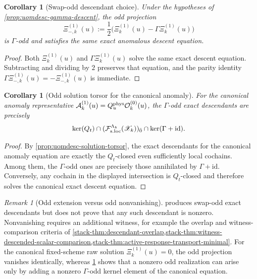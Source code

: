\documentclass[11pt]{article}
\theoremstyle{definition}
\theoremstyle{plain}
\newtheorem{corollary}[definition]{Corollary}
\theoremstyle{remark}
\newtheorem{remark}[definition]{Remark}
\newcommand{\Fsloc}{\mathcal F_{\rm s.loc}}
\newcommand{\Xscr}{\mathscr X}
\newcommand{\Ozero}{\mathcal O^{(0)}}
\newcommand{\Aone}{\mathcal A^{(1)}}
\newcommand{\Xione}{\Xi^{(1)}}
\newcommand{\Qt}{Q_t}
\newcommand{\Quphys}{Q_u^{\rm phys}}
\newcommand{\id}{\mathrm{id}}
\begin{document}
\begin{corollary}[Swap-odd descendant choice]
\label{cor:uomdesc-gamma-odd}
Under the hypotheses of \cref{prop:uomdesc-gamma-descent}, the odd projection
\[
\Xione_{-,k}(u)
:=
\frac12\big(\Xione_k(u)-\Gamma\Xione_k(u)\big)
\]
is \(\Gamma\)-odd and satisfies the same exact anomalous descent equation.
\end{corollary}

\begin{proof}
Both \(\Xione_k(u)\) and \(\Gamma\Xione_k(u)\) solve the same exact descent equation.
Subtracting and dividing by \(2\) preserves that equation, and the parity identity
\(\Gamma\Xione_{-,k}(u)=-\Xione_{-,k}(u)\) is immediate.
\end{proof}

\begin{corollary}[Odd solution torsor for the canonical anomaly]
\label{cor:uomdesc-odd-solution-torsor}
For the canonical anomaly representative \(\Aone_k(u)=\Quphys\Ozero_k(u)\), the \(\Gamma\)-odd exact
descendants are precisely
\[
\ker(\Qt)\cap(\Fsloc^{\Lambda_k}(\Xscr_k))_{\bar 0}\cap\ker(\Gamma+\id).
\]
\end{corollary}

\begin{proof}
By \cref{prop:uomdesc-solution-torsor}, the exact descendants for the canonical anomaly equation are
exactly the \(\Qt\)-closed even sufficiently local cochains.
Among them, the \(\Gamma\)-odd ones are precisely those annihilated by \(\Gamma+\id\).
Conversely, any cochain in the displayed intersection is \(\Qt\)-closed and therefore solves the
canonical exact descent equation.
\end{proof}

\begin{remark}[Odd extension versus odd nonvanishing]
\label{rem:uomdesc-third-closure}
 produces swap-odd exact descendants but does not prove
that any such descendant is nonzero.
Nonvanishing requires an additional witness, for example the overlap and witness-comparison
criteria of
\cref{stack-thm:descendant-overlap,stack-thm:witness-descended-scalar-comparison,stack-thm:active-response-transport-minimal}.
For the canonical fixed-scheme raw solution \(\Xione_k(u)=0\), the odd projection vanishes
identically, whereas \cref{cor:uomdesc-odd-solution-torsor} shows that a nonzero odd realization
can arise only by adding a nonzero \(\Gamma\)-odd kernel element of the canonical equation.
\end{remark}
\end{document}
